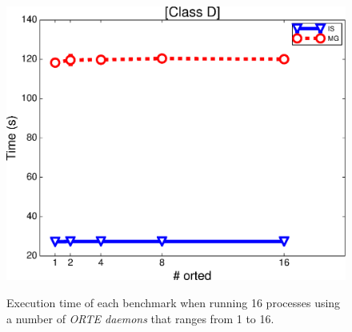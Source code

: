 \begin{figure}[t]
{   \includegraphics[scale=0.45]{img/orted_no_D_time.eps}
}
\caption[Multiple ORTE daemons benchmark]{Execution time of each benchmark when running 16 processes
using a number of \emph{ORTE daemons} that ranges from 1 to 16.}
  \label{fig:cap6-ortedstatic}%
\end{figure}

